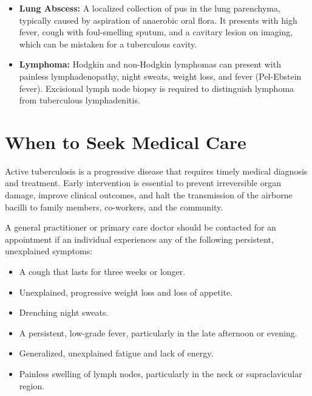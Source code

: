 \begin{itemize}
    \item \textbf{Lung Abscess:} A localized collection of pus in the lung parenchyma, typically caused by aspiration of anaerobic oral flora. It presents with high fever, cough with foul-smelling sputum, and a cavitary lesion on imaging, which can be mistaken for a tuberculous cavity.
    \item \textbf{Lymphoma:} Hodgkin and non-Hodgkin lymphomas can present with painless lymphadenopathy, night sweats, weight loss, and fever (Pel-Ebstein fever). Excisional lymph node biopsy is required to distinguish lymphoma from tuberculous lymphadenitis.
\end{itemize}

\section*{When to Seek Medical Care}
Active tuberculosis is a progressive disease that requires timely medical diagnosis and treatment. Early intervention is essential to prevent irreversible organ damage, improve clinical outcomes, and halt the transmission of the airborne bacilli to family members, co-workers, and the community.

A general practitioner or primary care doctor should be contacted for an appointment if an individual experiences any of the following persistent, unexplained symptoms:
\begin{itemize}
    \item A cough that lasts for three weeks or longer.
    \item Unexplained, progressive weight loss and loss of appetite.
    \item Drenching night sweats.
    \item A persistent, low-grade fever, particularly in the late afternoon or evening.
    \item Generalized, unexplained fatigue and lack of energy.
    \item Painless swelling of lymph nodes, particularly in the neck or supraclavicular region.
\end{itemize}

